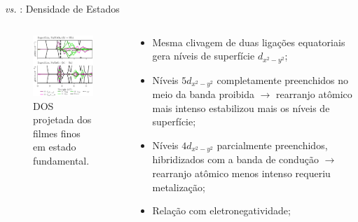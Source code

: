 \begin{frame}{\texorpdfstring{}{NaNbO3} \textit{vs.} \texorpdfstring{}{NaTaO3}: Densidade de Estados}
	\begin{columns}
		\begin{column}{.5\textwidth}
			\begin{figure}[t]
				\centering
				\includegraphics{../floats/pdos_nn_nt_tf/pdos_rlx_nn_nt_surface.pdf}
				\caption{DOS projetada dos filmes finos em estado fundamental.\label{fig:pdos_rlx_nn_nt_surface}}
			\end{figure}	
		\end{column}
		\begin{column}{.5\textwidth}
			\begin{itemize}
				\item Mesma clivagem de duas ligações equatoriais  gera níveis de superfície $d_{x^2-y^2}$;
				\item Níveis  $5d_{x^2-y^2}$ completamente preenchidos no meio da banda proibida $\to$ rearranjo atômico \alert{mais intenso} estabilizou mais os níveis de superfície;
				\item Níveis  $4d_{x^2-y^2}$ parcialmente preenchidos, hibridizados com a banda de condução $\to$ rearranjo atômico \alert{menos intenso} requeriu metalização;
				\item Relação com eletronegatividade;
			\end{itemize}
		\end{column}
	\end{columns}
\end{frame}
